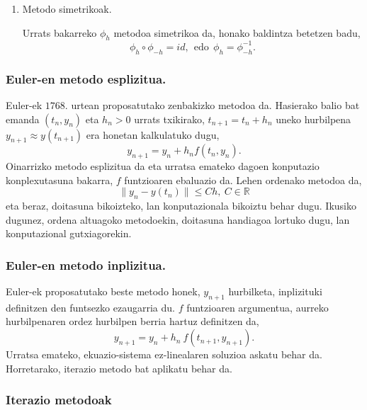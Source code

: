 \begin{enumerate}
\begin{enumerate}
\end{enumerate}

\item  Metodo simetrikoak.

Urrats bakarreko $\phi_h$ metodoa simetrikoa da, honako baldintza betetzen badu,
\begin{equation*}
\phi_h \circ \phi_{-h}=id,  \ \ \text{edo} \ \ \phi_h=\phi_{-h}^{-1}.
\end{equation*}


\end{enumerate}


\subsubsection*{Euler-en metodo esplizitua.}

Euler-ek $1768.$ urtean proposatutako zenbakizko metodoa da. Hasierako balio bat emanda $(t_n,y_n)$ eta $h_n>0$ urrats txikirako, $t_{n+1}=t_{n}+h_{n}$ uneko hurbilpena $y_ {n+1} \approx y(t_{n+1})$ era honetan kalkulatuko dugu,  
\begin{equation*}
 \label{eq:202a}
y_{n+1}=y_{n}+h_n f(t_n,y_n).
\end{equation*}
Oinarrizko metodo esplizitua da eta urratsa emateko dagoen konputazio konplexutasuna bakarra, $f$ funtzioaren ebaluazio da. Lehen ordenako metodoa da,
\begin{equation*}
\|y_n-y(t_n)\| \leqslant C h, \ C \in \mathbb{R}
\end{equation*}
eta beraz, doitasuna bikoizteko, lan konputazionala bikoiztu behar dugu. Ikusiko dugunez, ordena altuagoko metodoekin, doitasuna handiagoa lortuko dugu, lan konputazional gutxiagorekin. 

\subsubsection*{Euler-en metodo inplizitua.}

Euler-ek proposatutako beste metodo honek, $y_{n+1}$ hurbilketa, inplizituki definitzen den funtsezko ezaugarria du. $f$ funtzioaren argumentua, aurreko hurbilpenaren ordez hurbilpen berria hartuz definitzen da,
\begin{equation*}
 \label{eq:202b}
y_{n+1}=y_{n}+h_n \ f(t_{n+1},y_{n+1}).
\end{equation*}
Urratsa emateko, ekuazio-sistema ez-linealaren soluzioa askatu behar da. Horretarako, iterazio metodo bat aplikatu behar da.

\subsubsection*{Iterazio metodoak}

